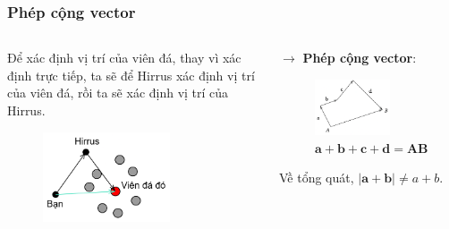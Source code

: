 \begin{frame}
    \frametitle{Phép cộng vector}
    \begin{columns}
    \begin{column}{0.5\textwidth}
        Để xác định vị trí của viên đá, thay vì xác định trực tiếp, ta sẽ để Hirrus xác định vị trí của viên đá, rồi ta sẽ xác định vị trí của Hirrus.
        \begin{figure}
            \centering
            \includegraphics[width=0.7\textwidth]{Slides/Figure/HirrusAndStones.png}
        \end{figure}
    \end{column}
    \begin{column}{0.5\textwidth}
        \(\longrightarrow\) \textbf{Phép cộng vector}:
        \begin{figure}[H]
            \centering
            \includegraphics[width=0.7\textwidth]{Slides/Figure/congvector.png}
            \caption{$\mathbf{a}+\mathbf{b}+\mathbf{c}+\mathbf{d}=\mathbf{AB}$}
        \end{figure}
        Về tổng quát, \(|\mathbf a +\mathbf b| \neq a+b\).
        \end{column}
    \end{columns}
\end{frame}

